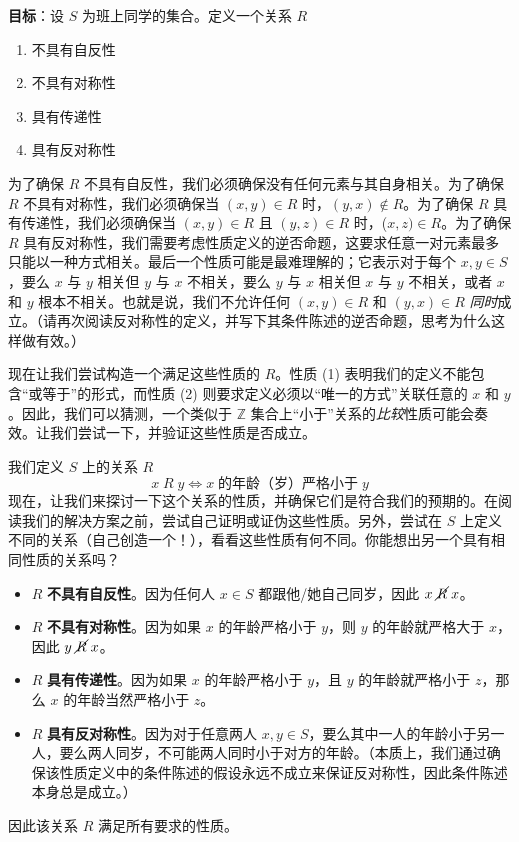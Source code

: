 \begin{example}\label{ex:example6.2.17}
    \textbf{目标}：设 $S$ 为班上同学的集合。定义一个关系 $R$ 
    \begin{enumerate}[label=(\arabic*)]
        \item 不具有自反性
        \item 不具有对称性
        \item 具有传递性
        \item 具有反对称性
    \end{enumerate}

    为了确保 $R$ 不具有自反性，我们必须确保没有任何元素与其自身相关。为了确保 $R$ 不具有对称性，我们必须确保当 $(x, y) \in R$ 时，$(y, x) \notin R$。为了确保 $R$ 具有传递性，我们必须确保当 $(x, y) \in R$ 且 $(y, z) \in R$ 时，($x, z) \in R$。为了确保 $R$ 具有反对称性，我们需要考虑性质定义的逆否命题，这要求任意一对元素最多只能以一种方式相关。最后一个性质可能是最难理解的；它表示对于每个 $x, y \in S$，要么 $x$ 与 $y$ 相关但 $y$ 与 $x$ 不相关，要么 $y$ 与 $x$ 相关但 $x$ 与 $y$ 不相关，或者 $x$ 和 $y$ 根本不相关。也就是说，我们不允许任何 $(x, y) \in R$ 和 $(y, x) \in R$ \emph{同时}成立。（请再次阅读反对称性的定义，并写下其条件陈述的逆否命题，思考为什么这样做有效。）

    现在让我们尝试构造一个满足这些性质的 $R$。性质 (1) 表明我们的定义不能包含``或等于''的形式，而性质 (2) 则要求定义必须以``唯一的方式''关联任意的 $x$ 和 $y$。因此，我们可以猜测，一个类似于 $\mathbb{Z}$ 集合上``小于''关系的\emph{比较}性质可能会奏效。让我们尝试一下，并验证这些性质是否成立。

    我们定义 $S$ 上的关系 $R$
    \[x \;R\; y \iff x \;\text{的年龄（岁）严格小于}\; y\]
    现在，让我们来探讨一下这个关系的性质，并确保它们是符合我们的预期的。在阅读我们的解决方案之前，尝试自己证明或证伪这些性质。另外，尝试在 $S$ 上定义不同的关系（自己创造一个！），看看这些性质有何不同。你能想出另一个具有相同性质的关系吗？

    \begin{itemize}
        \item $R$ \textbf{不具有自反性}。因为任何人 $x \in S$ 都跟他/她自己同岁，因此 $x \;\cancel{R}\; x$。
        \item $R$ \textbf{不具有对称性}。因为如果 $x$ 的年龄严格小于 $y$，则 $y$ 的年龄就严格大于 $x$，因此 $y \;\cancel{R}\; x$。
        \item $R$ \textbf{具有传递性}。因为如果 $x$ 的年龄严格小于 $y$，且 $y$ 的年龄就严格小于 $z$，那么 $x$ 的年龄当然严格小于 $z$。
        \item $R$ \textbf{具有反对称性}。因为对于任意两人 $x, y \in S$，要么其中一人的年龄小于另一人，要么两人同岁，不可能两人同时小于对方的年龄。（本质上，我们通过确保该性质定义中的条件陈述的假设永远不成立来保证反对称性，因此条件陈述本身总是成立。）
    \end{itemize}

    因此该关系 $R$ 满足所有要求的性质。
\end{example}

